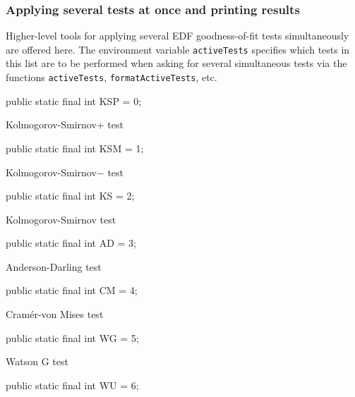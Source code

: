 \subsubsection* {Applying several tests at once and printing results}

Higher-level tools for applying several EDF goodness-of-fit tests
simultaneously are offered here.
The environment variable \texttt{activeTests} specifies which
tests in this list are to be performed when asking for several
simultaneous tests via the functions \texttt{activeTests},
\texttt{formatActiveTests}, etc.

\begin{code}

   public  static final int KSP = 0;
\end{code}
\begin{tabb} Kolmogorov-Smirnov+ test \end{tabb}
\begin{code}

   public static final int KSM = 1;
\end{code}
\begin{tabb}   Kolmogorov-Smirnov$-$ test \end{tabb}
\begin{code}

   public static final int KS = 2;
\end{code}
\begin{tabb}   Kolmogorov-Smirnov test  \end{tabb}
\begin{code}

   public static final int AD = 3;
\end{code}
\begin{tabb}   Anderson-Darling test  \end{tabb}
\begin{code}

   public static final int CM = 4;
\end{code}
\begin{tabb}   Cram\'er-von Mises test  \end{tabb}
\begin{code}

   public static final int WG = 5;
\end{code}
\begin{tabb}   Watson G test  \end{tabb}
\begin{code}

   public static final int WU = 6;
\end{code}
